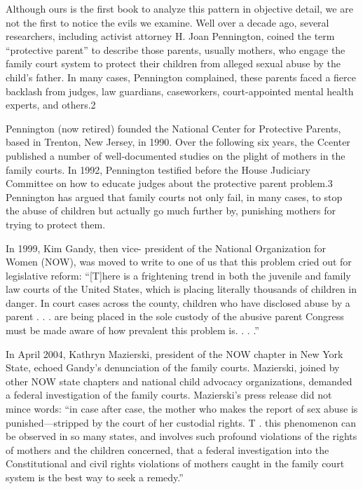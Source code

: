Although ours is the first book to analyze this pattern in objective detail, we are not the first to notice the evils we examine. Well over a decade ago, several researchers, including activist attorney H. Joan Pennington, coined the term “protective parent” to describe those parents, usually mothers, who engage the family court system to protect their children from alleged sexual abuse by the child’s father. In many cases, Pennington complained, these parents faced a fierce backlash from judges, law guardians, caseworkers, court-appointed mental health experts, and others.2  \pfl{} 


Pennington (now retired) founded the National Center for Protective Parents, based in Trenton, New Jersey, in 1990. Over the following six years, the Ccenter published a number of well-documented studies on the plight of mothers in the family courts. In 1992, Pennington testified before the House Judiciary Committee on how to educate judges about the protective parent problem.3 Pennington has argued that family courts not only fail, in many cases, to stop the abuse of children but actually go much further by, punishing mothers for trying to protect them. \pfl{}


In 1999, Kim Gandy, then vice- president of the National Organization for Women (NOW), was moved to write to one of us that this problem cried out for legislative reform: “[T]here is a frightening trend in both the juvenile and family law courts of the United States, which is placing literally thousands of children in danger. In court cases across the county, children who have disclosed abuse by a parent . . . are being placed in the sole custody of the abusive parent Congress must be made aware of how prevalent this problem is. . . .” \pfl{}


In April 2004, Kathryn Mazierski, president of the NOW chapter in New York State, echoed Gandy’s denunciation of the family courts. Mazierski, joined by other NOW state chapters and national child advocacy organizations, demanded a federal investigation of the family courts. Mazierski’s press release did not mince words: “in case after case, the mother who makes the report of sex abuse is punished—stripped by the court of her custodial rights. T . this phenomenon can be observed in so many states, and involves such profound violations of the rights of mothers and the children concerned, that a federal investigation into the Constitutional and civil rights violations of mothers caught in the family court system is the best way to seek a remedy.” \pfl{}


